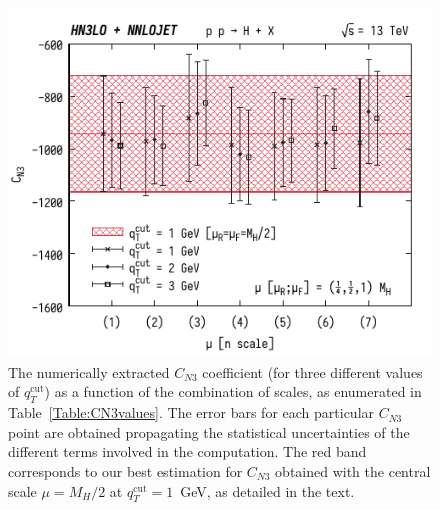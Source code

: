 \documentclass[12pt]{article}
\DeclareRobustCommand{\qtcut}{\ensuremath{q_T^\mathrm{cut}}\xspace}
\begin{document}
\begin{figure}
\centering
\includegraphics[width=.6\linewidth]{./new_figures/CN3_new_7_point_qT1_qT2_qT3}
\caption{\label{fig:CN3qT}{The numerically extracted $C_{N3}$ coefficient (for three different values of $\qtcut$) as a function of the combination of scales, as enumerated in Table~\ref{Table:CN3values}.
The error bars for each particular $C_{N3}$ point are obtained propagating the statistical uncertainties of the different terms involved in the computation. The red band corresponds to our best estimation for $C_{N3}$ obtained with the central scale $\mu=M_{H}/2$ at $\qtcut=1$~GeV, as detailed in the text.}}
\end{figure}
\end{document}
